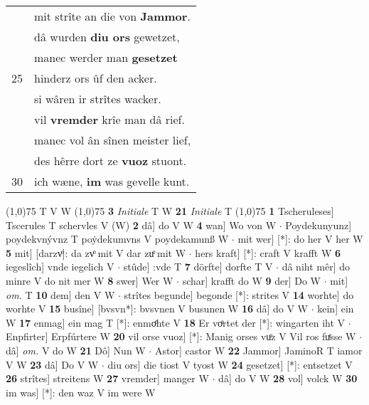 \documentclass[8pt,a4paper,notitlepage]{article}
\begin{document}
\begin{table}[ht]
\begin{minipage}[t]{0.5\linewidth}
\begin{tabular}{rl}
 & mit strîte an die von \textbf{Jammor}.\\ 
 & dâ wurden \textbf{diu ors} gewetzet,\\ 
 & manec werder man \textbf{gesetzet}\\ 
25 & hinderz ors ûf den acker.\\ 
 & si wâren ir strîtes wacker.\\ 
 & vil \textbf{vremder} krîe man dâ rief.\\ 
 & manec vol ân sînen meister lief,\\ 
 & des hêrre dort ze \textbf{vuoz} stuont.\\ 
30 & ich wæne, \textbf{im} was gevelle kunt.\\ 
\end{tabular}
\scriptsize
\line(1,0){75} \newline
T V W \newline
\line(1,0){75} \newline
\textbf{3} \textit{Initiale} T W  \textbf{21} \textit{Initiale} T  \newline
\line(1,0){75} \newline
\textbf{1} Tscheruleses] Tscerules T schervles V (W) \textbf{2} dâ] do V W \textbf{4} wan] Wo von W  $\cdot$ Poydekunyunz] poydekvnývnz T poẏdekumvns V poydekamunß W  $\cdot$ mit wer] [*]: do her V her W \textbf{5} mit] [darzvͦ]: da zvͦ mit V dar zuͦ mit W  $\cdot$ hers kraft] [*]: craft V krafft W \textbf{6} iegeslîch] vnde iegelich V  $\cdot$ stûde] :vde T \textbf{7} dörfte] dorfte T V  $\cdot$ dâ niht mêr] do minre V do nit mer W \textbf{8} swer] Wer W  $\cdot$ schar] krafft do W \textbf{9} der] Do W  $\cdot$ mit] \textit{om.} T \textbf{10} dem] den V W  $\cdot$ strîtes begunde] begonde [*]: strites V \textbf{14} worhte] do worhte V \textbf{15} busîne] [bvsvn*]: bvsvnen V busunen W \textbf{16} dâ] do V W  $\cdot$ kein] ein W \textbf{17} enmag] ein mag T [*]: enmoͤhte V \textbf{18} Er voͤrtet der [*]: wingarten iht V  $\cdot$ Enpfirter] Erpfúrtere W \textbf{20} vil orse vuoz] [*]: Manig orses vuͦz V Vil ros fuͤsse W  $\cdot$ dâ] \textit{om.} V do W \textbf{21} Dô] Nun W  $\cdot$ Astor] castor W \textbf{22} Jammor] JaminoR T iamor V W \textbf{23} dâ] Do V W  $\cdot$ diu ors] die tiost V tyost W \textbf{24} gesetzet] [*]: entsetzet V \textbf{26} strîtes] streitens W \textbf{27} vremder] manger W  $\cdot$ dâ] do V W \textbf{28} vol] volck W \textbf{30} im was] [*]: den waz V im were W \newline
\end{minipage}
\end{table}
\end{document}
